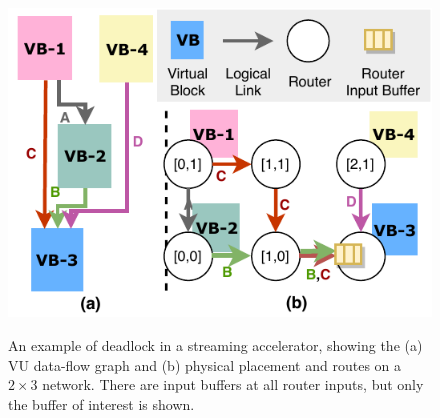\begin{figure}
\centering
\includegraphics[width=0.5\columnwidth]{figs/deadlock.pdf}
  \caption{An example of deadlock in a streaming accelerator, showing the (a) VU data-flow graph and (b) physical placement and routes on a $2\times3$ network. There are input buffers at all router inputs, but only the buffer of interest is shown.}\small\textsuperscript{}\label{fig:deadlock}
\end{figure}



